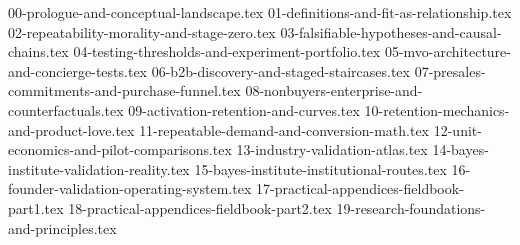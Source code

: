 
{00-prologue-and-conceptual-landscape.tex}
{01-definitions-and-fit-as-relationship.tex}
{02-repeatability-morality-and-stage-zero.tex}
{03-falsifiable-hypotheses-and-causal-chains.tex}
{04-testing-thresholds-and-experiment-portfolio.tex}
{05-mvo-architecture-and-concierge-tests.tex}
{06-b2b-discovery-and-staged-staircases.tex}
{07-presales-commitments-and-purchase-funnel.tex}
{08-nonbuyers-enterprise-and-counterfactuals.tex}
{09-activation-retention-and-curves.tex}
{10-retention-mechanics-and-product-love.tex}
{11-repeatable-demand-and-conversion-math.tex}
{12-unit-economics-and-pilot-comparisons.tex}
{13-industry-validation-atlas.tex}
{14-bayes-institute-validation-reality.tex}
{15-bayes-institute-institutional-routes.tex}
{16-founder-validation-operating-system.tex}
{17-practical-appendices-fieldbook-part1.tex}
{18-practical-appendices-fieldbook-part2.tex}
{19-research-foundations-and-principles.tex}
